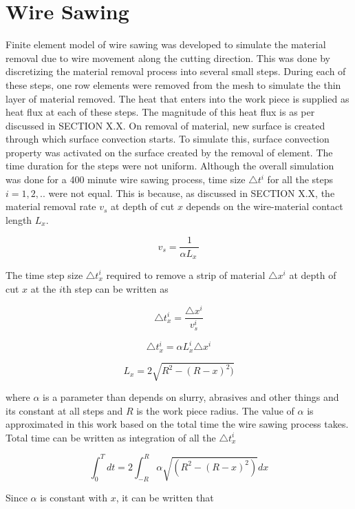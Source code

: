 \section{Wire Sawing}
Finite element model of wire sawing was developed to simulate the material removal due to wire movement along the cutting direction. This was done by discretizing the material removal process into several small steps. During each of these steps, one row elements were removed from the mesh to simulate the thin layer of material removed. The heat that enters into the work piece is supplied as heat flux at each of these steps. The magnitude of this heat flux is as per discussed in SECTION X.X. On removal of material, new surface is created through which surface convection starts. To simulate this, surface convection property was activated on the surface created by the removal of element. 
The time duration for the steps were not uniform. Although the overall simulation was done for a 400 minute wire sawing process, time size $\triangle t^{i}$ for all the steps $i=1,2,..$ were not equal. This is because, as discussed in SECTION X.X, the material removal rate $v_{s}$ at depth of cut $x$ depends on the wire-material contact length $L_{x}$. 

\begin{equation}
v_{s} =  \frac{1}{\alpha  L_{x} \ }
\label {cr-slip4}
\end{equation}

The time step size $\triangle t_{x}^{i}$ required  to remove a strip of material $\triangle x^{i}$ at depth of cut $x$ at the $i$th step can be written as

\[ \triangle t_{x}^{i} = \frac{\triangle x^{i}}{v_{s}^{i}}  \]

\begin{equation}
\triangle t_{x}^{i} = \alpha L_{x}^{i} \triangle x^{i}
\label {time-step}
\end{equation}

\[ L_{x} = 2 \sqrt{R^{2}-(R-x)^{2})} \]

where $\alpha$ is a parameter than depends on slurry, abrasives and other things and its constant at all steps and $R$ is the work piece radius. The value of $\alpha$ is approximated in this work based on the total time the wire sawing process takes. Total time can be written as integration of all the $\triangle t_{x}^{i}$

\[ \int_{0}^{T} dt = 2 \int_{-R}^{R} \alpha \sqrt{(R^{2}-(R-x)^{2})}dx \]

Since $\alpha$ is constant with $x$, it can be written that


